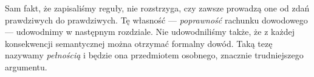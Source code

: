 \begin{uwaga}
Sam fakt, że zapisaliśmy reguły, nie rozstrzyga,
czy zawsze prowadzą one od zdań prawdziwych do prawdziwych.
Tę własność — \emph{poprawność} rachunku dowodowego —
udowodnimy w następnym rozdziale.
Nie udowodniliśmy także, że z każdej konsekwencji
semantycznej można otrzymać formalny dowód.
Taką tezę nazywamy \emph{pełnością} i będzie ona przedmiotem
osobnego, znacznie trudniejszego argumentu.
\end{uwaga}